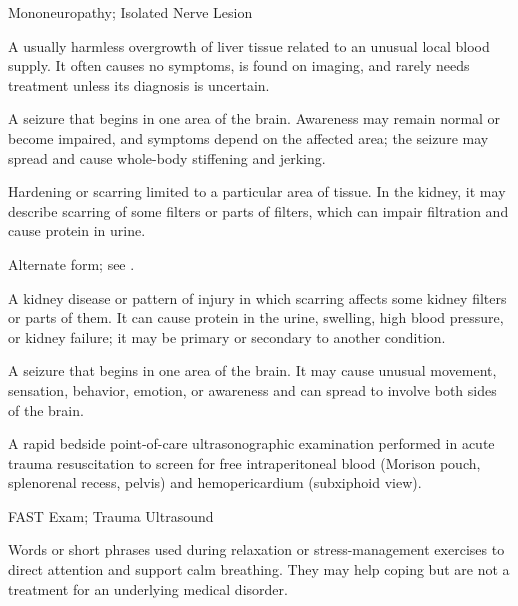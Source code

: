\synonyms
Mononeuropathy; Isolated Nerve Lesion

 A usually harmless overgrowth of liver tissue related to an unusual local blood supply. It often causes no symptoms, is found on imaging, and rarely needs treatment unless its diagnosis is uncertain.

 A seizure that begins in one area of the brain. Awareness may remain normal or become impaired, and symptoms depend on the affected area; the seizure may spread and cause whole-body stiffening and jerking.

 Hardening or scarring limited to a particular area of tissue. In the kidney, it may describe scarring of some filters or parts of filters, which can impair filtration and cause protein in urine.

 Alternate form; see .

 A kidney disease or pattern of injury in which scarring affects some kidney filters or parts of them. It can cause protein in the urine, swelling, high blood pressure, or kidney failure; it may be primary or secondary to another condition.

 A seizure that begins in one area of the brain. It may cause unusual movement, sensation, behavior, emotion, or awareness and can spread to involve both sides of the brain.

 A rapid bedside point-of-care ultrasonographic examination performed in acute trauma resuscitation to screen for free intraperitoneal blood (Morison pouch, splenorenal recess, pelvis) and hemopericardium (subxiphoid view).

\synonyms
FAST Exam; Trauma Ultrasound

 Words or short phrases used during relaxation or stress-management exercises to direct attention and support calm breathing. They may help coping but are not a treatment for an underlying medical disorder.

